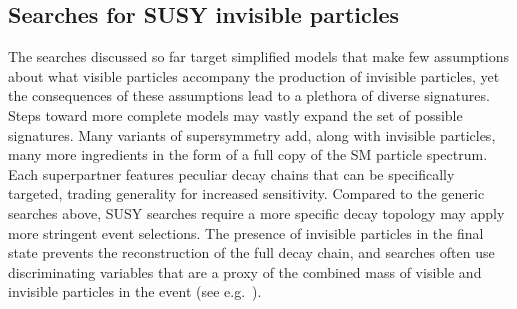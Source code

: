 
\subsection{Searches for SUSY invisible particles}
\label{sec:results_SUSYSearches}




 



The searches discussed so far target simplified models that make few assumptions about what visible particles accompany the production of invisible particles, yet the consequences of these assumptions lead to a plethora of diverse signatures. 
Steps toward more complete models may vastly expand the set of possible signatures. Many variants of supersymmetry add, along with invisible particles, many more ingredients in the form of a full copy of the SM particle spectrum. Each superpartner features peculiar decay chains that can be specifically targeted, trading generality for increased sensitivity. 
Compared to the generic searches above, SUSY searches require a more specific decay topology may apply more stringent event selections. The presence of invisible particles in the final state prevents the reconstruction of the full decay chain, and searches often use discriminating variables that are a proxy of the combined mass of visible and invisible particles in the event (see e.g.~\cite{Lester:1999tx}). 

